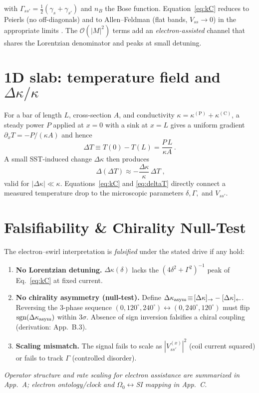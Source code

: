 \documentclass[aps,prb,preprint,amsmath,amssymb]{revtex4-2} %
\begin{document}
        with $\Gamma_{ss'}=\tfrac12(\gamma_s+\gamma_{s'})$ and $n_B$ the Bose function. Equation~\eqref{eq:kC} reduces to Peierls (no off-diagonals) and to Allen--Feldman (flat bands, $V_{ss}\!\to\!0$) in the appropriate limits \cite{Peierls1929,AllenFeldman1993,Simoncelli2022}. The $\mathcal O(|M|^2)$ terms add an \emph{electron-assisted} channel that shares the Lorentzian denominator and peaks at small detuning.

    \section{1D slab: temperature field and $\Delta\kappa/\kappa$}
        For a bar of length $L$, cross-section $A$, and conductivity $\kappa=\kappa^{(\mathrm P)}+\kappa^{(\mathrm C)}$, a steady power $P$ applied at $x=0$ with a sink at $x=L$ gives a uniform gradient $\partial_x T = -P/(\kappa A)$ and hence
        \begin{equation}
            \Delta T \equiv T(0)-T(L) = \frac{P\,L}{\kappa A}\,.
        \end{equation}
        A small SST-induced change $\Delta\kappa$ then produces
        \begin{equation}
            \boxed{\;\Delta(\Delta T) \approx -\frac{\Delta\kappa}{\kappa}\,\Delta T\;,}\label{eq:deltaT}
        \end{equation}
        valid for $|\Delta\kappa|\ll\kappa$. Equations~\eqref{eq:kC} and \eqref{eq:deltaT} directly connect a measured temperature drop to the microscopic parameters $\delta,\Gamma,$ and $V_{ss'}$.

    \section{Falsifiability \& Chirality Null-Test}
        \label{sec:falsifiability}
        The electron–swirl interpretation is \emph{falsified} under the stated drive if any hold:
        \begin{enumerate}
            \item \textbf{No Lorentzian detuning.} $\Delta\kappa(\delta)$ lacks the $(4\delta^2+\Gamma^2)^{-1}$ peak of Eq.~\eqref{eq:kC} at fixed current.
            \item \textbf{No chirality asymmetry (null-test).} Define $\Delta\kappa_{\rm asym}\!\equiv\![\Delta\kappa]_{\rightarrow}-[\Delta\kappa]_{\leftarrow}$. Reversing the 3-phase sequence $(0,120^\circ,240^\circ)\!\leftrightarrow\!(0,240^\circ,120^\circ)$ must flip ${\rm sgn}(\Delta\kappa_{\rm asym})$ within $3\sigma$. Absence of sign inversion falsifies a chiral coupling (derivation: App.~B.3).
            \item \textbf{Scaling mismatch.} The signal fails to scale as $|V^{(x)}_{ss'}|^2$ (coil current squared) or fails to track $\Gamma$ (controlled disorder).
        \end{enumerate}
        \emph{Operator structure and rate scaling for electron assistance are summarized in App.~A; electron ontology/clock and $\Omega_0\!\leftrightarrow$SI mapping in App.~C.}
\end{document}

